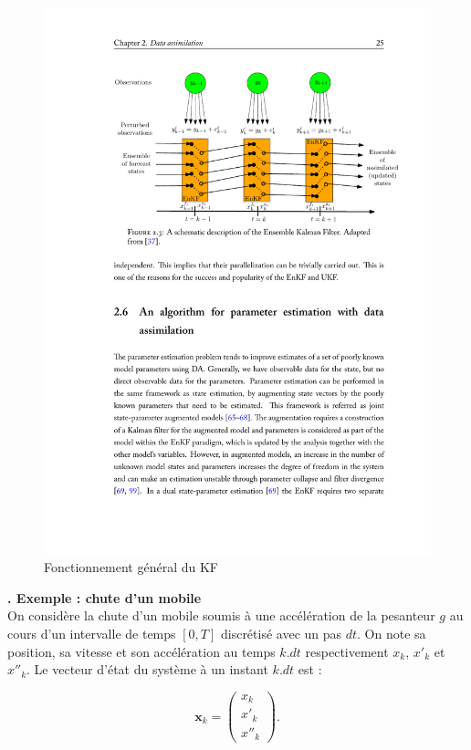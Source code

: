 \documentclass[a4paper]{article}
\newcounter{c}
\newcounter{d}
\newcounter{r}
\newcounter{e}
\newcommand{\chapitre}[1]{\stepcounter{c}\setcounter{e}{0}\setcounter{d}{0}\setcounter{r}{0}\noindent\textbf{\Large\arabic{c}. #1}\\}
\newcommand{\x}{\mathbf x}
\begin{document}
\begin{figure}[!h]
\includegraphics[width=\textwidth,trim = 3.5cm 18.1cm 3cm 3.5cm, clip]{kfchart.pdf}
\caption{Fonctionnement général du KF}
\end{figure}

\newpage
\chapitre{Exemple : chute d'un mobile}

On considère la chute d'un mobile soumis à une accélération de la pesanteur $g$ au cours d'un intervalle de temps $[0,T]$ discrétisé avec un pas $dt$. On note sa position, sa vitesse et son accélération au temps $k.dt$ respectivement $x_k$, $x'_k$ et $x''_k$. Le vecteur d'état du système à un instant $k.dt$ est :

$$\x_k=\left(\begin{matrix}x_k\\x'_k\\x''_k\end{matrix}\right).$$
\end{document}

